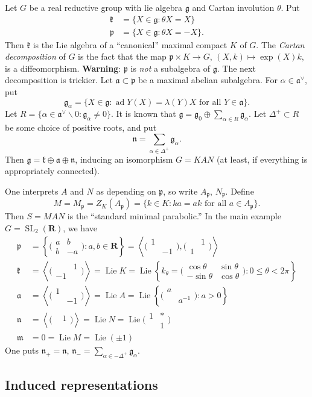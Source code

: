 \documentclass{article}
\DeclareMathOperator{\adjoint}{ad}
\DeclareMathOperator{\lie}{Lie}
\DeclareMathOperator{\speciallinear}{SL}
\newcommand{\dR}{\mathbf{R}}
\newcommand{\fa}{\mathfrak{a}}
\newcommand{\fg}{\mathfrak{g}}
\newcommand{\fk}{\mathfrak{k}}
\newcommand{\fm}{\mathfrak{m}}
\newcommand{\fn}{\mathfrak{n}}
\newcommand{\fp}{\mathfrak{p}}
\newcommand{\smat}[4]{\bigl(\begin{smallmatrix} {#1} & {#2} \\ {#3} & {#4} \end{smallmatrix} \bigr)}
\theoremstyle{definition}
\begin{document}
Let $G$ be a real reductive group with lie algebra $\fg$ and Cartan involution 
$\theta$. Put 
\begin{align*}
  \fk &= \{X\in \fg:\theta X=X\} \\
  \fp &= \{X\in \fg:\theta X=-X\} .
\end{align*}
Then $\fk$ is the Lie algebra of a ``canonical'' maximal compact $K$ of $G$. 
The \emph{Cartan decomposition} of $G$ is the fact that the map 
$\fp\times K\to G$, $(X,k)\mapsto \exp(X) k$, is a diffeomorphism. 
\textbf{Warning}: $\fp$ is \emph{not} a subalgebra of $\fg$. The next 
decomposition is trickier. Let $\fa\subset \fp$ be a maximal abelian 
subalgebra. For $\alpha\in \fa^\vee$, put 
\[
  \fg_\alpha=\{X\in \fg:\adjoint Y(X)=\lambda(Y) X\text{ for all }Y\in \fa\} .
\]
Let $R=\{\alpha\in \fa^\vee\smallsetminus 0:\fg_\alpha\ne 0\}$. It is known 
that $\fg=\fg_0\oplus \sum_{\alpha\in R} \fg_\alpha$. Let $\Delta^+\subset R$ 
be some choice of positive roots, and put 
\[
  \fn = \sum_{\alpha\in \Delta^+} \fg_\alpha .
\]
Then $\fg=\fk\oplus \fa\oplus \fn$, inducing an isomorphism 
$G=K A N$ (at least, if everything is appropriately connected). 

One interprets $A$ and $N$ as depending on $\fp$, so write $A_\fp$, $N_\fp$. 
Define 
\[
  M = M_\fp = Z_K(A_\fp) = \{k\in K:k a = a k\text{ for all }a\in A_\fp\} .
\]
Then $S=M A N$ is the ``standard minimal parabolic.'' In the main example 
$G=\speciallinear_2(\dR)$, we have 
\begin{align*}
  \fp &= \left\{\smat{a}{b}{b}{-a}:a,b\in \dR\right\} = \left\langle \smat{1}{}{}{-1},\smat{}{1}{1}{}\right\rangle \\
  \fk &= \left\langle \smat{}{1}{-1}{}\right\rangle  = \lie K = \lie\left\{k_\theta = \smat{\cos\theta}{\sin\theta}{-\sin\theta}{\cos\theta} :0\leqslant \theta < 2\pi\right\} \\
  \fa &= \left\langle \smat{1}{}{}{-1} \right\rangle  = \lie A = \lie\left\{\smat{a}{}{}{a^{-1}} : a>0\right\} \\
  \fn &= \left\langle \smat{}{1}{}{}\right\rangle = \lie N = \lie\smat{1}{\ast}{}{1} \\
  \fm &= 0 = \lie M = \lie(\pm 1)
\end{align*}
One puts $\fn_+=\fn$, $\fn_-=\sum_{\alpha\in -\Delta^+} \fg_\alpha$. 


\subsection{Induced representations}
\end{document}
